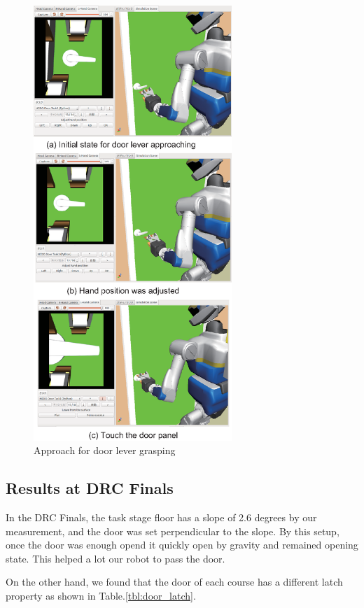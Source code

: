 \begin{figure}[t]
  \centering
  \includegraphics[width = 7.5cm]{img/approach_door_lever.eps}
  \caption{Approach for door lever grasping}
  \label{fig:door_lever_grasp}
\end{figure}


\subsection{Results at DRC Finals}
%
In the DRC Finals, the task stage floor has a slope of 2.6 degrees by 
our measurement, and the door was set perpendicular to the slope. 
By this setup, once the door was enough opend it quickly open by gravity
and remained opening state. This helped a lot our robot to pass the door.

On the other hand, we found that the door of each course has a different latch property
as shown in Table.\ref{tbl:door_latch}.

